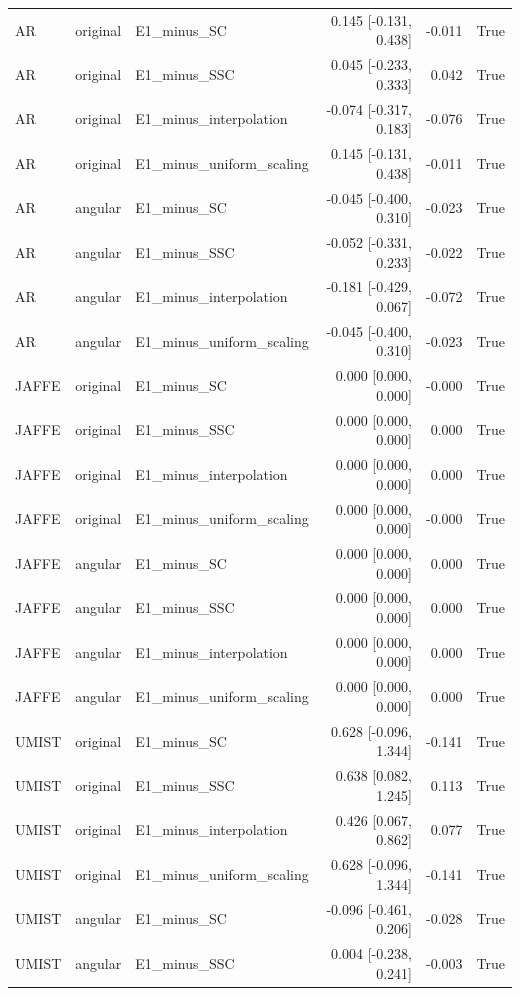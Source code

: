 \begin{longtable}{llp{.28\linewidth}rrl}
AR & original & E1\_minus\_SC & 0.145 [-0.131, 0.438] & -0.011 & True\\
AR & original & E1\_minus\_SSC & 0.045 [-0.233, 0.333] & 0.042 & True\\
AR & original & E1\_minus\_interpolation & -0.074 [-0.317, 0.183] & -0.076 & True\\
AR & original & E1\_minus\_uniform\_scaling & 0.145 [-0.131, 0.438] & -0.011 & True\\
AR & angular & E1\_minus\_SC & -0.045 [-0.400, 0.310] & -0.023 & True\\
AR & angular & E1\_minus\_SSC & -0.052 [-0.331, 0.233] & -0.022 & True\\
AR & angular & E1\_minus\_interpolation & -0.181 [-0.429, 0.067] & -0.072 & True\\
AR & angular & E1\_minus\_uniform\_scaling & -0.045 [-0.400, 0.310] & -0.023 & True\\
JAFFE & original & E1\_minus\_SC & 0.000 [0.000, 0.000] & -0.000 & True\\
JAFFE & original & E1\_minus\_SSC & 0.000 [0.000, 0.000] & 0.000 & True\\
JAFFE & original & E1\_minus\_interpolation & 0.000 [0.000, 0.000] & 0.000 & True\\
JAFFE & original & E1\_minus\_uniform\_scaling & 0.000 [0.000, 0.000] & -0.000 & True\\
JAFFE & angular & E1\_minus\_SC & 0.000 [0.000, 0.000] & 0.000 & True\\
JAFFE & angular & E1\_minus\_SSC & 0.000 [0.000, 0.000] & 0.000 & True\\
JAFFE & angular & E1\_minus\_interpolation & 0.000 [0.000, 0.000] & 0.000 & True\\
JAFFE & angular & E1\_minus\_uniform\_scaling & 0.000 [0.000, 0.000] & 0.000 & True\\
UMIST & original & E1\_minus\_SC & 0.628 [-0.096, 1.344] & -0.141 & True\\
UMIST & original & E1\_minus\_SSC & 0.638 [0.082, 1.245] & 0.113 & True\\
UMIST & original & E1\_minus\_interpolation & 0.426 [0.067, 0.862] & 0.077 & True\\
UMIST & original & E1\_minus\_uniform\_scaling & 0.628 [-0.096, 1.344] & -0.141 & True\\
UMIST & angular & E1\_minus\_SC & -0.096 [-0.461, 0.206] & -0.028 & True\\
UMIST & angular & E1\_minus\_SSC & 0.004 [-0.238, 0.241] & -0.003 & True\\

\end{longtable}
